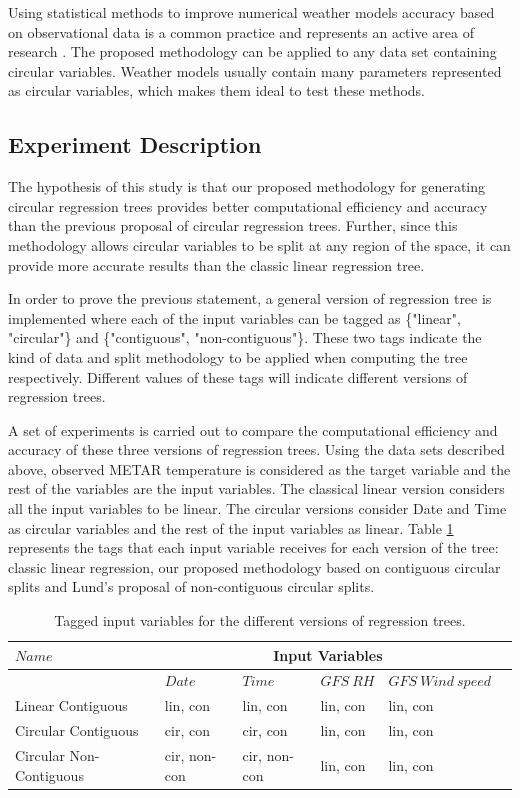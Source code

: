 \documentclass[times,twocolumn,final,authoryear]{elsarticle}
\begin{document}
Using statistical methods to improve numerical weather models accuracy based on observational data is a common practice and represents an active area of research \citep{Larraondoetal2014, Salamehetal2009}. The proposed methodology can be applied to any data set containing circular variables. Weather models usually contain many parameters represented as circular variables, which makes them ideal to test these methods.

\subsection{Experiment Description}

The hypothesis of this study is that our proposed methodology for generating circular regression trees provides better computational efficiency and accuracy than the previous proposal of circular regression trees. Further, since this methodology allows circular variables to be split at any region of the space, it can provide more accurate results than the classic linear regression tree.

In order to prove the previous statement, a general version of regression tree is implemented where each of the input variables can be tagged as \{"linear", "circular"\} and \{"contiguous", "non-contiguous"\}. These two tags indicate the kind of data and split methodology to be applied when computing the tree respectively. Different values of these tags will indicate different versions of regression trees.

A set of experiments is carried out to compare the computational efficiency and accuracy of these three versions of regression trees. Using the data sets described above, observed METAR temperature is considered as the target variable and the rest of the variables are the input variables. The classical linear version considers all the input variables to be linear. The circular versions consider Date and Time as circular variables and the rest of the input variables as linear. Table \ref{t3} represents the tags that each input variable receives for each version of the tree: classic linear regression, our proposed methodology based on contiguous circular splits and Lund's proposal of non-contiguous circular splits.

\begin{table}[t]
\caption{Tagged input variables for the different versions of regression trees.}\label{t3}
\begin{center}
\begin{tabular}{llllll}
\hline\hline
$Name$ & \multicolumn{4}{c}{Input Variables} \\ \hline
 & $Date$ & $Time$ & $GFS\ RH$ & $GFS\ Wind\ speed $\\
\hline
Linear Contiguous & lin, con & lin, con & lin, con & lin, con\\
Circular Contiguous & cir, con & cir, con & lin, con & lin, con\\
Circular Non-Contiguous & cir, non-con & cir, non-con & lin, con & lin, con\\
\hline
\end{tabular}
\end{center}
\end{table}
\end{document}
